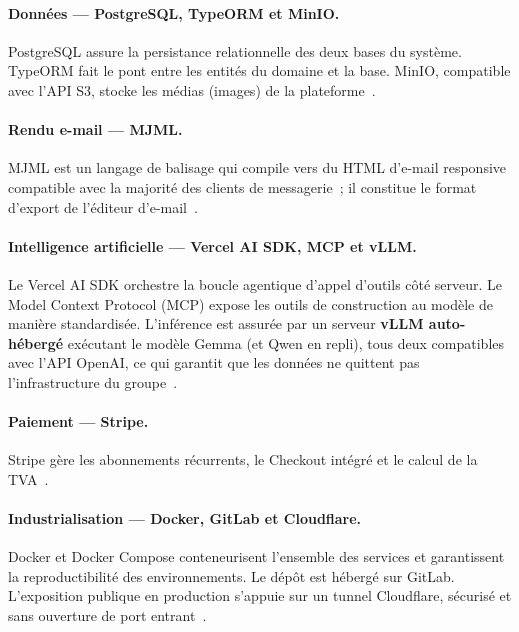 
\paragraph{Données — PostgreSQL, TypeORM et MinIO.}
PostgreSQL assure la persistance relationnelle des deux bases du système.
TypeORM fait le pont entre les entités du domaine et la base. MinIO, compatible
avec l'API S3, stocke les médias (images) de la plateforme~\cite{postgresql,typeorm,minio}.


\paragraph{Rendu e-mail — MJML.}
MJML est un langage de balisage qui compile vers du HTML d'e-mail
responsive compatible avec la majorité des clients de messagerie~; il
constitue le format d'export de l'éditeur d'e-mail~\cite{mjml}.

\paragraph{Intelligence artificielle — Vercel AI SDK, MCP et vLLM.}
Le Vercel AI SDK orchestre la boucle agentique d'appel d'outils côté
serveur. Le Model Context Protocol (MCP) expose les outils de construction
au modèle de manière standardisée. L'inférence est assurée par un serveur
\textbf{vLLM auto-hébergé} exécutant le modèle Gemma (et Qwen en repli),
tous deux compatibles avec l'API OpenAI, ce qui garantit que les données ne
quittent pas l'infrastructure du groupe~\cite{vercelaisdk,mcp,vllm,gemma}.


\paragraph{Paiement — Stripe.}
Stripe gère les abonnements récurrents, le Checkout intégré et le calcul de
la TVA~\cite{stripe}.

\paragraph{Industrialisation — Docker, GitLab et Cloudflare.}
Docker et Docker Compose conteneurisent l'ensemble des services et
garantissent la reproductibilité des environnements. Le dépôt est hébergé
sur GitLab. L'exposition publique en production s'appuie sur un tunnel
Cloudflare, sécurisé et sans ouverture de port entrant~\cite{docker,cloudflaretunnel}.

